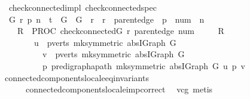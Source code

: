 \begin{isabellebody}
\isamarkupfalse%
%
\endisatagproof
{\isafoldproof}%
%
\isadelimproof
\isanewline
%
\endisadelimproof
\isanewline
{}\isamarkupfalse%
\ {\isacharparenleft}\ check{\isacharunderscore}connected{\isacharunderscore}impl{\isacharparenright}\ check{\isacharunderscore}connected{\isacharunderscore}spec{\isacharcolon}\isanewline
\ \ {\isachardoublequoteopen}{\isasymAnd}G\ r\ p\ n{\isachardot}\ {\isasymGamma}\ {\isasymturnstile}\isactrlsub t\ {\isasymlbrace}\ {\isasymacute}G\ {\isacharequal}\ G\ {\isasymand}\ {\isasymacute}r\ {\isacharequal}\ r\ {\isasymand}\ {\isasymacute}parent{\isacharunderscore}edge\ {\isacharequal}\ p\ {\isasymand}\ {\isasymacute}num\ {\isacharequal}\ n\ {\isasymrbrace}\isanewline
\ \ \ \ {\isasymacute}R\ {\isacharcolon}{\isacharequal}{\isacharequal}\ PROC\ check{\isacharunderscore}connected{\isacharparenleft}{\isasymacute}G{\isacharcomma}\ {\isasymacute}r{\isacharcomma}\ {\isasymacute}parent{\isacharunderscore}edge{\isacharcomma}\ {\isasymacute}num{\isacharparenright}\isanewline
\ \ \ \ {\isasymlbrace}\ {\isasymacute}R\ {\isasymlongrightarrow}\isanewline
\ \ \ \ \ \ \ \ {\isacharparenleft}{\isasymforall}u\ {\isasymin}\ pverts\ {\isacharparenleft}mk{\isacharunderscore}symmetric\ {\isacharparenleft}abs{\isacharunderscore}IGraph\ G{\isacharparenright}{\isacharparenright}{\isachardot}\isanewline
\ \ \ \ \ \ \ \ \ \ {\isasymforall}v\ {\isasymin}\ pverts\ {\isacharparenleft}mk{\isacharunderscore}symmetric\ {\isacharparenleft}abs{\isacharunderscore}IGraph\ G{\isacharparenright}{\isacharparenright}{\isachardot}\ \isanewline
\ \ \ \ \ \ \ \ \ \ {\isasymexists}p{\isachardot}\ pre{\isacharunderscore}digraph{\isachardot}apath\ {\isacharparenleft}mk{\isacharunderscore}symmetric\ {\isacharparenleft}abs{\isacharunderscore}IGraph\ G{\isacharparenright}{\isacharparenright}\ u\ p\ v{\isacharparenright}{\isasymrbrace}{\isachardoublequoteclose}\isanewline
%
\isadelimproof
%
\endisadelimproof
%
\isatagproof
{}\isamarkupfalse%
\ connected{\isacharunderscore}components{\isacharunderscore}locale{\isacharunderscore}eq{\isacharunderscore}invariants\isanewline
\ \ \ \ \ \ connected{\isacharunderscore}components{\isacharunderscore}locale{\isacharunderscore}imp{\isacharunderscore}correct\ \isanewline
{}\isamarkupfalse%
\ vcg\ metis%
\endisatagproof
{\isafoldproof}%
%
\isadelimproof
\isanewline
%
\endisadelimproof
%
\isadelimtheory
\isanewline
%
\endisadelimtheory
%
\isatagtheory
{}\isamarkupfalse%
%
\endisatagtheory
{\isafoldtheory}%
%
\isadelimtheory
%
\endisadelimtheory
\end{isabellebody}%
